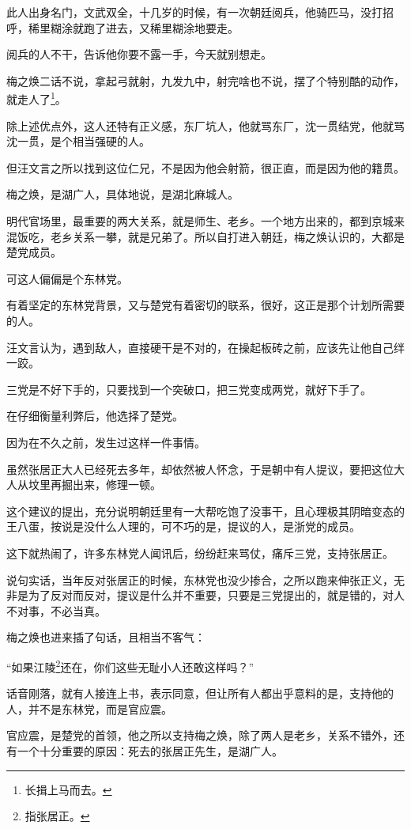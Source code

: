 \begin{multicols}{\theparacolNo}
		此人出身名门，文武双全，十几岁的时候，有一次朝廷阅兵，他骑匹马，没打招呼，稀里糊涂就跑了进去，又稀里糊涂地要走。

		阅兵的人不干，告诉他你要不露一手，今天就别想走。

		梅之焕二话不说，拿起弓就射，九发九中，射完啥也不说，摆了个特别酷的动作，就走人了\footnote{长揖上马而去。}。

		除上述优点外，这人还特有正义感，东厂坑人，他就骂东厂，沈一贯结党，他就骂沈一贯，是个相当强硬的人。

		但汪文言之所以找到这位仁兄，不是因为他会射箭，很正直，而是因为他的籍贯。

		梅之焕，是湖广人，具体地说，是湖北麻城人。

		明代官场里，最重要的两大关系，就是师生、老乡。一个地方出来的，都到京城来混饭吃，老乡关系一攀，就是兄弟了。所以自打进入朝廷，梅之焕认识的，大都是楚党成员。

		可这人偏偏是个东林党。

		有着坚定的东林党背景，又与楚党有着密切的联系，很好，这正是那个计划所需要的人。

		汪文言认为，遇到敌人，直接硬干是不对的，在操起板砖之前，应该先让他自己绊一跤。

		三党是不好下手的，只要找到一个突破口，把三党变成两党，就好下手了。

		在仔细衡量利弊后，他选择了楚党。

		因为在不久之前，发生过这样一件事情。

		虽然张居正大人已经死去多年，却依然被人怀念，于是朝中有人提议，要把这位大人从坟里再掘出来，修理一顿。

		这个建议的提出，充分说明朝廷里有一大帮吃饱了没事干，且心理极其阴暗变态的王八蛋，按说是没什么人理的，可不巧的是，提议的人，是浙党的成员。

		这下就热闹了，许多东林党人闻讯后，纷纷赶来骂仗，痛斥三党，支持张居正。

		说句实话，当年反对张居正的时候，东林党也没少掺合，之所以跑来伸张正义，无非是为了反对而反对，提议是什么并不重要，只要是三党提出的，就是错的，对人不对事，不必当真。

		梅之焕也进来插了句话，且相当不客气：

		“如果江陵\footnote{指张居正。}还在，你们这些无耻小人还敢这样吗？”

		话音刚落，就有人接连上书，表示同意，但让所有人都出乎意料的是，支持他的人，并不是东林党，而是官应震。

		官应震，是楚党的首领，他之所以支持梅之焕，除了两人是老乡，关系不错外，还有一个十分重要的原因：死去的张居正先生，是湖广人。


\end{multicols}
